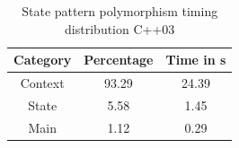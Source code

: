 {%
 


 
\begin{table}[h]\begin{center}
\begin{tabular}{|c|c|c|}\hline
\textbf{Category} & \textbf{Percentage} & \textbf{Time in s}\\
\hline
Context & 93.29 & 24.39\\
\hline
State & 5.58 & 1.45\\
\hline
Main & 1.12 & 0.29\\
\hline
\end{tabular}
\caption{State pattern polymorphism timing distribution C++03}
\label{tab:StatePatternPolymorphismTimingDistributionCpp03}
\end{center}\end{table}
 
}
